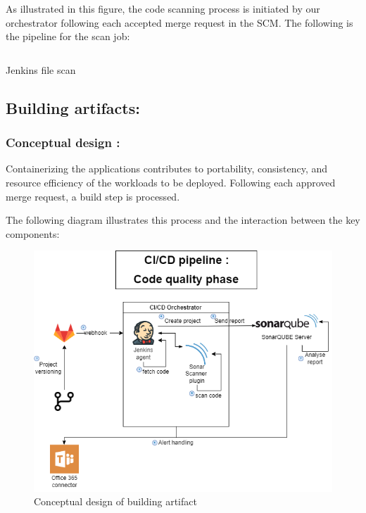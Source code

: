 As illustrated in this figure, the code scanning process is initiated by our orchestrator following each accepted merge request in the SCM. The following is the pipeline for the scan job: 

 
\begin{listing}[H]
    \inputminted{Dockerfile}{codeListing/Jenkinsfile_scan}
    \caption{ Jenkins file scan}
    \label{lst:jenkinsfile_scan}
\end{listing}
 

\subsection{Building artifacts: }

\subsubsection{Conceptual design :}

Containerizing the applications contributes to portability, consistency, and resource efficiency of the workloads to be deployed. Following each approved merge request, a build step is processed. 

The following diagram illustrates this process and the interaction between the key components: 

\begin{figure}[H]\centering
\includegraphics[width=1.0\textwidth,angle=00]{assets/f48.png}
\caption{Conceptual design of building artifact }
\label{fig:Conceptual design of building artifact }
\end{figure}

